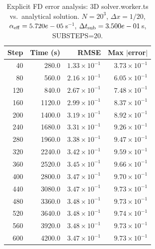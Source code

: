 \begin{table}[H]
\centering
\caption{Explicit FD error analysis: 3D solver.worker.ts vs.~analytical solution. $N=20^3$, $\Delta x = 1/20$, $\alpha_{\rm eff}=5.720e-05$\,s$^{-1}$, $\Delta t_{\rm sub}=3.500e-01$\,s, SUBSTEPS=20.}
\begin{tabular}{rrrr}
\hline
Step & Time (s) & RMSE & Max $|$error$|$ \\
\hline
40 & 280.0 & $1.33 \times 10^{-1}$ & $3.73 \times 10^{-1}$ \\
80 & 560.0 & $2.16 \times 10^{-1}$ & $6.05 \times 10^{-1}$ \\
120 & 840.0 & $2.67 \times 10^{-1}$ & $7.48 \times 10^{-1}$ \\
160 & 1120.0 & $2.99 \times 10^{-1}$ & $8.37 \times 10^{-1}$ \\
200 & 1400.0 & $3.19 \times 10^{-1}$ & $8.92 \times 10^{-1}$ \\
240 & 1680.0 & $3.31 \times 10^{-1}$ & $9.26 \times 10^{-1}$ \\
280 & 1960.0 & $3.38 \times 10^{-1}$ & $9.47 \times 10^{-1}$ \\
320 & 2240.0 & $3.42 \times 10^{-1}$ & $9.59 \times 10^{-1}$ \\
360 & 2520.0 & $3.45 \times 10^{-1}$ & $9.66 \times 10^{-1}$ \\
400 & 2800.0 & $3.47 \times 10^{-1}$ & $9.70 \times 10^{-1}$ \\
440 & 3080.0 & $3.47 \times 10^{-1}$ & $9.73 \times 10^{-1}$ \\
480 & 3360.0 & $3.48 \times 10^{-1}$ & $9.73 \times 10^{-1}$ \\
520 & 3640.0 & $3.48 \times 10^{-1}$ & $9.74 \times 10^{-1}$ \\
560 & 3920.0 & $3.48 \times 10^{-1}$ & $9.73 \times 10^{-1}$ \\
600 & 4200.0 & $3.47 \times 10^{-1}$ & $9.73 \times 10^{-1}$ \\
\hline
\end{tabular}
\end{table}
